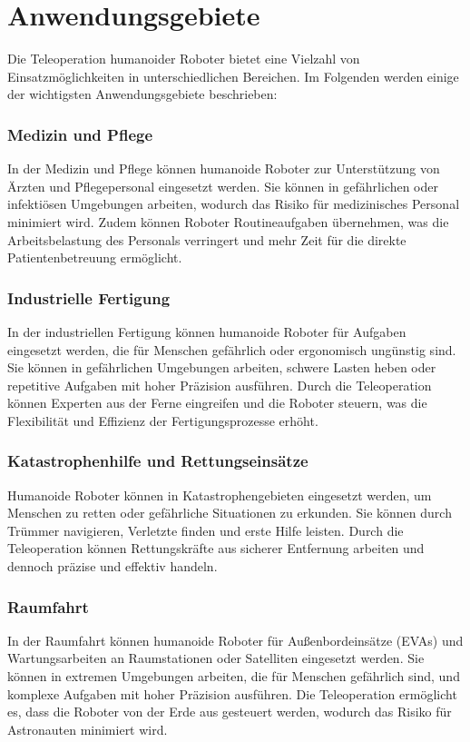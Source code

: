 \chapter{Anwendungsgebiete}

Die Teleoperation humanoider Roboter bietet eine Vielzahl von Einsatzmöglichkeiten in unterschiedlichen Bereichen. Im Folgenden werden einige der wichtigsten Anwendungsgebiete beschrieben:

\subsection{Medizin und Pflege}
In der Medizin und Pflege können humanoide Roboter zur Unterstützung von Ärzten und Pflegepersonal eingesetzt werden. Sie können in gefährlichen oder infektiösen Umgebungen arbeiten, wodurch das Risiko für medizinisches Personal minimiert wird. Zudem können Roboter Routineaufgaben übernehmen, was die Arbeitsbelastung des Personals verringert und mehr Zeit für die direkte Patientenbetreuung ermöglicht.

\subsection{Industrielle Fertigung}
In der industriellen Fertigung können humanoide Roboter für Aufgaben eingesetzt werden, die für Menschen gefährlich oder ergonomisch ungünstig sind. Sie können in gefährlichen Umgebungen arbeiten, schwere Lasten heben oder repetitive Aufgaben mit hoher Präzision ausführen. Durch die Teleoperation können Experten aus der Ferne eingreifen und die Roboter steuern, was die Flexibilität und Effizienz der Fertigungsprozesse erhöht.

\subsection{Katastrophenhilfe und Rettungseinsätze}
Humanoide Roboter können in Katastrophengebieten eingesetzt werden, um Menschen zu retten oder gefährliche Situationen zu erkunden. Sie können durch Trümmer navigieren, Verletzte finden und erste Hilfe leisten. Durch die Teleoperation können Rettungskräfte aus sicherer Entfernung arbeiten und dennoch präzise und effektiv handeln.

\subsection{Raumfahrt}
In der Raumfahrt können humanoide Roboter für Außenbordeinsätze (EVAs) und Wartungsarbeiten an Raumstationen oder Satelliten eingesetzt werden. Sie können in extremen Umgebungen arbeiten, die für Menschen gefährlich sind, und komplexe Aufgaben mit hoher Präzision ausführen. Die Teleoperation ermöglicht es, dass die Roboter von der Erde aus gesteuert werden, wodurch das Risiko für Astronauten minimiert wird.

